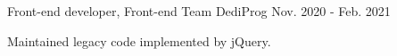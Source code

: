 

\begin{cventries}

  \cventry
    {Front-end developer, Front-end Team} %
    {\color{gray}DediProg}
    {}
    {Nov. 2020 - Feb. 2021} %
    {
      \begin{cvitems} %
        \item {Maintained legacy code implemented by jQuery.}
      \end{cvitems}
    }
\end{cventries}
